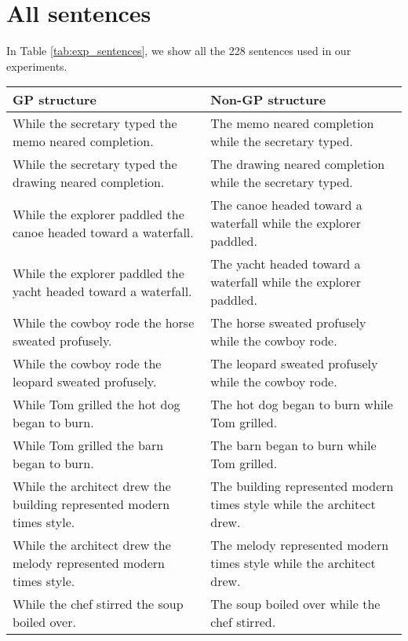 \section{All sentences}
\label{sec:appendix_sents}

In Table \ref{tab:exp_sentences}, we show all the 228 sentences used in our experiments. \\ 

\clearpage %
\onecolumn

\begin{center}
    \scriptsize
    \begin{xtabular*}{\textwidth}{p{0.45\textwidth}|p{0.45\textwidth}}
        \hline
        \textbf{GP structure} & \textbf{Non-GP structure} \\
        \hline
        While the secretary typed the memo neared completion. & The memo neared completion while the secretary typed. \\
        While the secretary typed the drawing neared completion. & The drawing neared completion while the secretary typed. \\
        While the explorer paddled the canoe headed toward a waterfall. & The canoe headed toward a waterfall while the explorer paddled. \\
        While the explorer paddled the yacht headed toward a waterfall. & The yacht headed toward a waterfall while the explorer paddled. \\
        While the cowboy rode the horse sweated profusely. & The horse sweated profusely while the cowboy rode. \\
        While the cowboy rode the leopard sweated profusely. & The leopard sweated profusely while the cowboy rode. \\
        While Tom grilled the hot dog began to burn. & The hot dog began to burn while Tom grilled. \\
        While Tom grilled the barn began to burn. & The barn began to burn while Tom grilled. \\
        While the architect drew the building represented modern times style. & The building represented modern times style while the architect drew. \\
        While the architect drew the melody represented modern times style. & The melody represented modern times style while the architect drew. \\
        While the chef stirred the soup boiled over. & The soup boiled over while the chef stirred. \\

\end{xtabular*}
\end{center}
